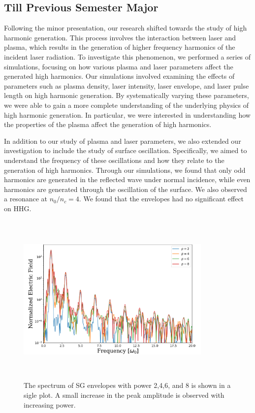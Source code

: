 \documentclass[12pt]{article}
\begin{document}
\subsection{Till Previous Semester Major}
Following the minor presentation, our research shifted towards the study of high harmonic generation. This process involves the interaction between laser and plasma, which results in the generation of higher frequency harmonics of the incident laser radiation. To investigate this phenomenon, we performed a series of simulations, focusing on how various plasma and laser parameters affect the generated high harmonics. Our simulations involved examining the effects of parameters such as plasma density, laser intensity, laser envelope, and laser pulse length on high harmonic generation. By systematically varying these parameters, we were able to gain a more complete understanding of the underlying physics of high harmonic generation. In particular, we were interested in understanding how the properties of the plasma affect the generation of high harmonics.

In addition to our study of plasma and laser parameters, we also extended our investigation to include the study of surface oscillation. Specifically, we aimed to understand the frequency of these oscillations and how they relate to the generation of high harmonics. Through our simulations, we found that only odd harmonics are generated in the reflected wave under normal incidence, while even harmonics are generated through the oscillation of the surface. We also observed a resonance at $n_0/n_c = 4$. We found that the envelopes had no significant effect on HHG.
\begin{figure}[h]
    \centering
    \includegraphics[width=0.85\textwidth, height=8.5cm]{images/sg_2.png}
    \caption{The spectrum of SG envelopes with power 2,4,6, and 8 is shown in a sigle plot. A small increase in the peak amplitude is observed with increasing power.}
    \label{fig:sg}
\end{figure}
\end{document}
